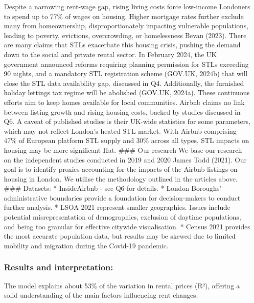 \documentclass[
  a4paper,
  DIV=11,
  numbers=noendperiod]{scrartcl}
\begin{document}
Despite a narrowing rent-wage gap, rising living costs force low-income
Londoners to spend up to 77\% of wages on housing. Higher mortgage rates
further exclude many from homeownership, disproportionately impacting
vulnerable populations, leading to poverty, evictions, overcrowding, or
homelessness Bevan (2023). There are many claims that STLs exacerbate
this housing crisis, pushing the demand down to the social and private
rental sector. In February 2024, the UK government announced reforms
requiring planning permission for STLs exceeding 90 nights, and a
mandatory STL registration scheme (GOV.UK, 2024b) that will close the
STL data availability gap, discussed in Q4. Additionally, the furnished
holiday lettings tax regime will be abolished (GOV.UK, 2024a). These
continuous efforts aim to keep homes available for local communities.
Airbnb claims no link between listing growth and rising housing costs,
backed by studies discussed in Q6. A caveat of published studies is
their UK-wide statistics for some parameters, which may not reflect
London's heated STL market. With Airbnb comprising 47\% of European
platform STL supply and 30\% across all types, STL impacts on housing
may be more significant Hat. \#\#\# Our research We base our research on
the independent studies conducted in 2019 and 2020 James Todd (2021).
Our goal is to identify proxies accounting for the impacts of the Airbnb
listings on housing in London. We utilise the methodology outlined in
the articles above. \#\#\# Datasets: * InsideAirbnb - see Q6 for
details. * London Boroughs' administrative boundaries provide a
foundation for decision-makers to conduct further analysis. * LSOA 2021
represent smaller geographies. Issues include potential
misrepresentation of demographics, exclusion of daytime populations, and
being too granular for effective citywide visualisation. * Census 2021
provides the most accurate population data, but results may be skewed
due to limited mobility and migration during the Covid-19 pandemic.

\subsubsection{Results and
interpretation:}\label{results-and-interpretation}

The model explains about 53\% of the variation in rental prices (R²),
offering a solid understanding of the main factors influencing rent
changes.
\end{document}
